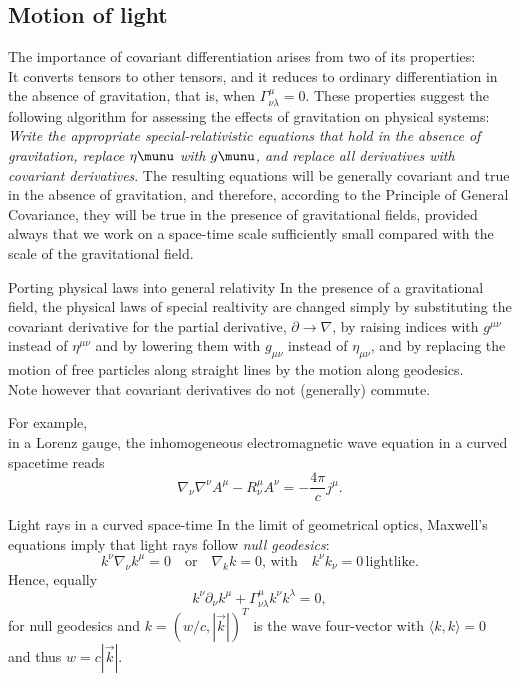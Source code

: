 \subsection{Motion of light}
The importance of covariant differentiation arises from two of its properties:\\
It converts tensors to other tensors, and it reduces to ordinary differentiation in the absence of gravitation, that is, when $\Gamma^\mu_{\nu \lambda}=0$. These properties suggest the following algorithm for assessing the effects of gravitation on physical systems:\\
\emph{Write the appropriate special-relativistic equations that hold in the absence of gravitation, replace $\eta\munu$ with $g\munu$, and replace all derivatives with covariant derivatives}. The resulting equations will be generally covariant and true in the absence of gravitation, and therefore, according to the Principle of General Covariance, they will be true in the presence of gravitational fields, provided always that we work on a space-time scale sufficiently small compared with the scale of the gravitational field.
\begin{mybox}{Porting physical laws into general relativity}
	In the presence of a gravitational field, the physical laws of special realtivity are changed simply by substituting the covariant derivative for the partial derivative, $\partial \rightarrow \nabla$, by raising indices with $g^{\mu \nu}$ instead of $\eta^{\mu \nu}$ and by lowering them with $g_{\mu \nu}$ instead of $\eta_{\mu \nu}$, and by replacing the motion of free particles along straight lines by the motion along geodesics.\\
	Note however that covariant derivatives do not (generally) commute.
\end{mybox}
For example,\\
in a Lorenz gauge, the inhomogeneous electromagnetic wave equation in a curved spacetime reads
\begin{equation}
	\nabla_{\nu} \nabla^{\nu} A^{\mu} - R^{\mu}_{\nu} A^{\nu} = - \frac{4 \pi}{c} j^{\mu}.
\end{equation}
\begin{mybox}{Light rays in a curved space-time}
	In the limit of geometrical optics, Maxwell's equations imply that light rays follow \emph{null geodesics}:
	\begin{equation}
		k^{\nu} \nabla_{\nu} k^{\mu} = 0 \quad \mathrm{or} \quad \nabla_k k = 0, \, \mathrm{with} \quad k^{\nu } k_{\nu} = 0 \, \mathrm{ lightlike}.
	\end{equation}
	Hence, equally 
	\begin{equation}
		k^{\nu} \partial_{\nu} k^{\mu} + \Gamma^{\mu}_{\nu \lambda} k^{\nu} k^{\lambda} =0,
	\end{equation}
	for null geodesics and $k = (w/c, |\vec{k}|)^T$ is the wave four-vector with $\langle k,k \rangle =0$ and thus $w = c | \vec{k}|$.
\end{mybox}
